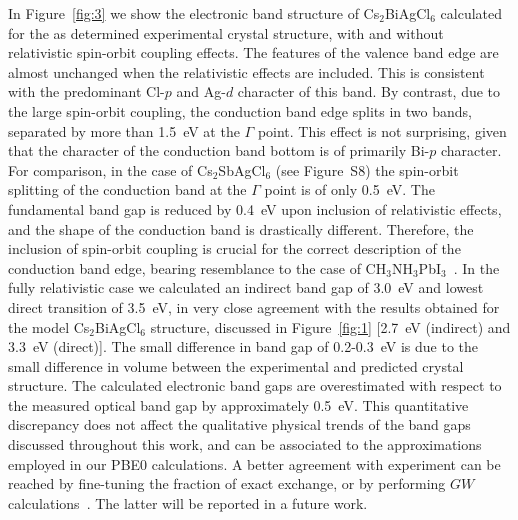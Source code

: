 \documentclass[journal=jpcl,manuscript=letter,layout=traditional]{achemso}
\begin{document}
In Figure~\ref{fig:3} we show the electronic band structure of Cs$_2$BiAgCl$_6$ calculated for the as determined experimental crystal structure,
with and without relativistic spin-orbit coupling effects. The features of the valence band edge are almost unchanged
when the relativistic effects are included. This is consistent with the predominant Cl-$p$ and Ag-$d$ character of this band.
By contrast, due to the large spin-orbit coupling, the conduction band edge splits in two bands, separated by more than 1.5~eV at the $\Gamma$ point.
This effect is not surprising, given that the character of the conduction band bottom is
of primarily Bi-$p$ character. For comparison, in the case of Cs$_2$SbAgCl$_6$ (see Figure~S8) the
spin-orbit splitting of the conduction band at the $\Gamma$ point is of only 0.5~eV. The fundamental band gap is reduced by 0.4~eV
upon inclusion of relativistic effects, and the shape of the conduction band is drastically different. Therefore, the inclusion
of spin-orbit coupling is crucial for the correct description of the conduction band edge, bearing resemblance to the
case of CH$_3$NH$_3$PbI$_3$~\cite{Even2013,  Filip2014-2}. In the fully relativistic case we calculated an indirect band gap of
3.0~eV and lowest direct transition of 3.5~eV, in very close agreement  with the results obtained for the model Cs$_2$BiAgCl$_6$ structure,
discussed in Figure~\ref{fig:1} [2.7~eV (indirect) and 3.3~eV (direct)]. The small difference in band gap of 0.2-0.3~eV is due to the
small difference in volume between the experimental and predicted crystal structure. The calculated electronic
band gaps are overestimated with respect to the measured optical band gap by approximately 0.5~eV. This quantitative discrepancy does not
affect the qualitative physical trends of the band gaps discussed throughout this work, and can be associated to the approximations
employed in our PBE0 calculations. A better agreement with experiment can be reached by fine-tuning the fraction of exact
exchange, or by performing $GW$ calculations~\cite{Hedin, Hybertsen}. The latter will be reported in a future work.
\end{document}
